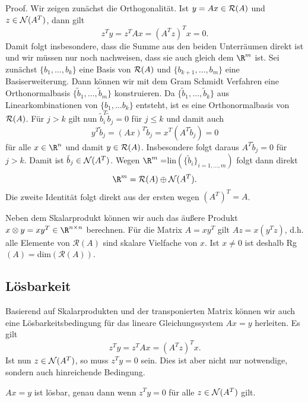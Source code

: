 \begin{emphBox}{}{}
Proof. Wir zeigen zunächst die Orthogonalität. Ist \(y=Ax \in {\cal R}(A)\) und \(z \in {\cal N}(A^T)\), dann gilt
\begin{equation*}
 z^T y = z^T A x = (A^T z)^T x = 0.
\end{equation*}
Damit folgt insbesondere, dass die Summe aus den beiden Unterräumen direkt ist und wir müssen nur noch nachweisen, dass sie auch gleich dem \(\R^m\) ist. Sei zunächst \(\{b_1,\ldots,b_k\}\) eine Basis von \({\cal R}(A)\) und \(\{b_{k+1},\ldots,b_m\}\) eine Basiserweiterung. Dann können wir mit dem Gram Schmidt Verfahren eine Orthonormalbasis  \(\{\tilde b_1,\ldots, \tilde b_m\}\)
konstruieren. Da \(\{\tilde b_1, \ldots, \tilde b_k\}\) aus Linearkombinationen von \(\{b_1, \ldots b_k\}\) entsteht, ist es eine Orthonormalbasis von \({\cal R}(A)\). Für \(j > k\) gilt nun \(\tilde b_i^T \tilde b_j = 0\) für \(j \leq k\) und damit auch
\begin{equation*}
 y^T \tilde b_j = (Ax)^T \tilde b_j = x^T (A^T \tilde b_j) = 0
\end{equation*}
für alle \(x \in \R^n\) und damit \(y \in {\cal R}(A)\). Insbesondere folgt daraus \(A^T \tilde b_j = 0\) für \(j > k\). Damit ist \(\tilde b_j \in {\cal N}(A^T)\). Wegen \(\R^m  = \)lin\((\{\tilde b_i\}_{i=1,\ldots,m})\) folgt dann direkt
\begin{equation*}
 \R^m  = {\cal R}(A) \oplus {\cal N}(A^T).
\end{equation*}
Die zweite Identität folgt direkt aus der ersten wegen \((A^T)^T = A\).
\end{emphBox}

Neben dem Skalarprodukt können wir auch das äußere Produkt \(x \otimes y = x y^T \in \R^{n \times n}\) berechnen. Für die Matrix \(A=x y^T\) gilt \(A z = x(y^T z)\), d.h. alle Elemente von \({\mathcal R}(A)\) sind skalare Vielfache von \(x\). Ist \(x \neq 0\) ist deshalb Rg\((A) = \)dim\(({\mathcal R}(A))\).


\subsection{Lösbarkeit}
\label{\detokenize{vektorraeume/LGS:losbarkeit}}
Basierend auf Skalarprodukten und der transponierten Matrix können wir auch eine Lösbarkeitsbedingung für das lineare Gleichungssystem \(A x = y\) herleiten. Es gilt
\begin{equation*}
 z^T y = z^T A x = (A^T z)^T x.
\end{equation*}
Ist nun \(z \in {\cal N}(A^T)\), so muss \(z^T y = 0\) sein. Dies ist aber nicht nur notwendige, sondern auch hinreichende Bedingung.
\label{vektorraeume/LGS:theorem-6}
\begin{theorem}{}{}



\(Ax=y\) ist lösbar, genau dann wenn \(z^T y = 0\) für alle \(z \in {\cal N}(A^T)\) gilt.
\end{theorem}

